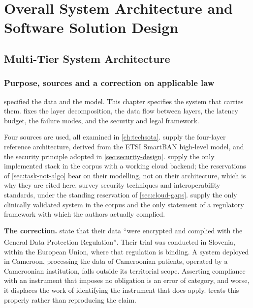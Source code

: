 \documentclass[12pt,a4paper,oneside]{report}
\newcommand{\bq}[1]{``#1''\textsuperscript{\dag}}
\begin{document}
\chapter{Overall System Architecture and Software Solution Design}\label{ch:architecture}

\section{Multi-Tier System Architecture}\label{sec:architecture}

\subsection*{Purpose, sources and a correction on applicable law}

 specified the data and the model. This chapter specifies the system that carries them.  fixes the layer decomposition, the data flow between layers, the latency budget, the failure modes, and the security and legal framework.

Four sources are used, all examined in \cref{ch:techsota}. \Textcite{mucchi2021} supply the four-layer reference architecture, derived from the ETSI SmartBAN high-level model, and the security principle adopted in \cref{sec:security-design}. \Textcite{efendi2025} supply the only implemented stack in the corpus with a working cloud backend; the reservations of \cref{sec:task-not-algo} bear on their modelling, not on their architecture, which is why they are cited here. \Textcite{liu2025review} survey security techniques and interoperability standards, under the standing reservation of \cref{sec:cloud-gaps}. \Textcite{mihevc2025} supply the only clinically validated system in the corpus and the only statement of a regulatory framework with which the authors actually complied.

\textbf{The correction.} \Textcite{mihevc2025} state that their data \bq{were encrypted and complied with the General Data Protection Regulation}. Their trial was conducted in Slovenia, within the European Union, where that regulation is binding. A system deployed in Cameroon, processing the data of Cameroonian patients, operated by a Cameroonian institution, falls outside its territorial scope. Asserting compliance with an instrument that imposes no obligation is an error of category, and worse, it displaces the work of identifying the instrument that does apply.  treats this properly rather than reproducing the claim.
\end{document}
